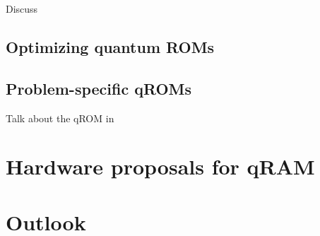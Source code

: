 \documentclass[a4paper,12pt]{article}
\begin{document}
Discuss \cite{Vadym2018}

\subsection{Optimizing quantum ROMs}

\subsection{Problem-specific qROMs}

Talk about the qROM in \cite{Babbush2018}

\section{Hardware proposals for qRAM}
\label{sec:hardware}




\section{Outlook}
\label{sec:outlook}




\end{document}
